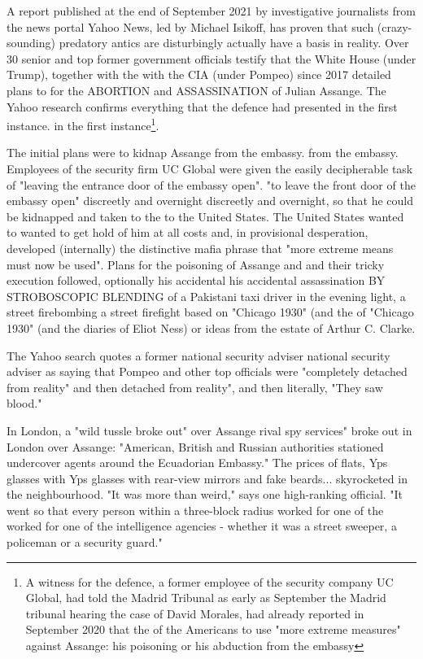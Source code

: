 \begin{multicols}{2}
A report published at the end of September 2021 by
investigative journalists from the news portal Yahoo
News, led by Michael Isikoff, has proven that such (crazy-sounding) predatory antics are disturbingly
actually have a basis in reality. Over 30 senior
and top former government officials testify
that the White House (under Trump), together with the
with the CIA (under Pompeo) since 2017 detailed plans to
for the ABORTION and ASSASSINATION of Julian Assange. The Yahoo research confirms
everything that the defence had presented in the first instance.
in the first instance\footnote[18]{A witness for the defence, a former employee of the security company UC Global, had told the Madrid Tribunal as early as September
the Madrid tribunal hearing the case of David Morales, had already reported in September 2020 that the
of the Americans to use "more extreme measures" against Assange: his poisoning or his abduction from the embassy}.

The initial plans were to kidnap Assange from the embassy.
from the embassy. Employees of the security firm UC Global were given the easily decipherable task of "leaving the entrance door of the embassy open".
"to leave the front door of the embassy open" discreetly and overnight
discreetly and overnight, so that he could be kidnapped and taken to the
to the United States. The United States wanted to
wanted to get hold of him at all costs and, in provisional desperation, developed (internally) the distinctive
mafia phrase that "more extreme means must now be used". Plans for the poisoning of Assange and
and their tricky execution followed, optionally his accidental
his accidental assassination BY STROBOSCOPIC BLENDING of a Pakistani taxi driver in the evening light, a street firebombing
a street firefight based on "Chicago 1930" (and the
of "Chicago 1930" (and the diaries of Eliot Ness)
or ideas from the estate of Arthur C. Clarke.

The Yahoo search quotes a former national security adviser
national security adviser as saying that Pompeo
and other top officials were "completely detached from reality" and then
detached from reality", and then literally, "They saw blood."

In London, a "wild tussle broke out" over Assange
rival spy services" broke out in London over Assange: "American, British and Russian authorities stationed undercover agents around the Ecuadorian
Embassy." The prices of flats, Yps glasses with
Yps glasses with rear-view mirrors and fake beards...
skyrocketed in the neighbourhood. "It was more than
weird," says one high-ranking official. "It went so
that every person within a three-block radius worked for one of the
worked for one of the intelligence agencies - whether it was a street sweeper, a policeman or a security guard."


\end{multicols}
